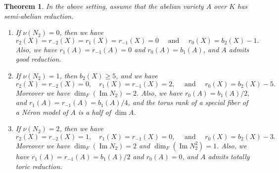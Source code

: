 \documentclass[12pt,reqno]{amsart}
\newtheorem{thm}{Theorem}[section]
\theoremstyle{definition}
\renewcommand\Im{\mathop{\mathrm{Im}}\nolimits}
\numberwithin{equation}{section}
\begin{document}
\begin{thm}
\label{thm:l-adic monodromy}
In the above setting, assume that the abelian variety $A$ over $K$ has semi-abelian reduction.
\begin{enumerate}
    \item 
    If $\nu (N_{2})=0$,
    then we have
    \[
    r_2(X)=r_{-2}(X)=r_1(X)=r_{-1}(X)=0 \quad \text{ and } 
    \quad
    r_0(X)=b_2(X)-1.
    \]
    Also, we have $r_1(A)=r_{-1}(A)=0$ and $r_{0}(A) = b_1(A)$, and $A$ admits good reduction.
    \item 
    If $\nu (N_2) =1$, 
    then $b_2(X) \geq 5$, and we have 
    \[
    r_2(X)= r_{-2}(X)=0, \quad r_1(X) = r_{-1}(X)=2, \quad \text{ and } \quad  r_0(X)= b_2(X)-5.
    \]
     Moreover we have $\dim_{F} (\Im N_{2}) =2$.
    Also, we have $r_0(A)=b_1(A)/2,$ and
    $ r_{1}(A) = r_{-1}(A)=b_1(A)/4$, and the torus rank of a special fiber of a N\'{e}ron model of $A$ is a half of $\dim A$.
    \item
    If $\nu (N_{2}) =2$, 
    then we have
    \[
    r_2(X)= r_{-2}(X)=1, \quad r_1(X) = r_{-1}(X)=0, \quad \text{ and } \quad  r_0(X)= b_2(X)-3.
    \]
    Moreover we have $\dim_{F} (\Im N_{2}) =2$ and $\dim_{F} (\Im N^2_{2}) =1$.
    Also, we have 
    $ r_{1}(A) = r_{-1}(A)=b_1(A)/2$
    and
    $r_0(A)=0$, and $A$ admits totally toric reduction. 
\end{enumerate}
\end{thm}
\end{document}
